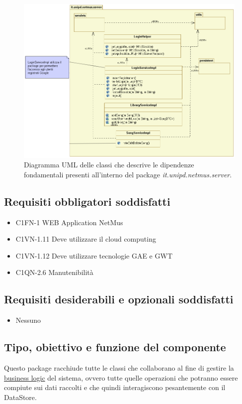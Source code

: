 \begin{figure}[!h]
  \centering
  \includegraphics[width=15cm]{img/DP/classes_server.png}
\caption{Diagramma UML delle classi che descrive le dipendenze
fondamentali presenti all'interno del package
\emph{it.unipd.netmus.server}.}
\end{figure}


\subsection*{Requisiti obbligatori soddisfatti}
\begin{itemize}
	\item C1FN-1 WEB Application NetMus
	\item C1VN-1.11 Deve utilizzare il cloud computing
	\item C1VN-1.12 Deve utilizzare tecnologie GAE e GWT
	\item C1QN-2.6 Manutenibilit\`a
\end{itemize}
\subsection*{Requisiti desiderabili e opzionali soddisfatti}
\begin{itemize}
    \item Nessuno
\end{itemize}
\subsection*{Tipo, obiettivo e funzione del componente} %
Questo package racchiude tutte le classi che collaborano al fine di gestire la
\underline{business logic} del sistema, ovvero tutte quelle operazioni che
potranno essere compiute sui dati raccolti e che quindi interagiscono pesantemente con il
DataStore.  
